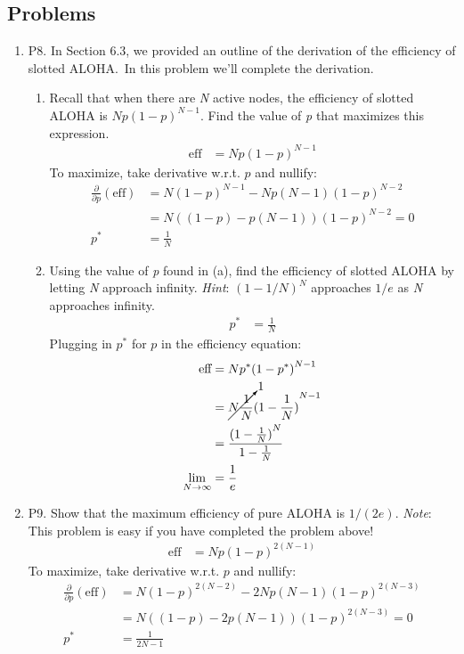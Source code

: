 \documentclass[12pt]{article}
\begin{document}
\subsection*{Problems}
\begin{enumerate}
    \item P8. In Section 6.3, we provided an outline of the derivation of the efficiency of slotted ALOHA.\ In this problem we’ll complete the derivation.
    \begin{enumerate}
        \item Recall that when there are \textit{N} active nodes, the efficiency of slotted ALOHA is \(Np{(1 - p)}^{N-1}\). Find the value of \textit{p} that maximizes this expression.
        \begin{align*}
            \text{eff}&=Np{(1 - p)}^{N-1}
        \end{align*}
        To maximize, take derivative w.r.t. \(p\) and nullify:
        \begin{align*}
            \frac{\partial}{\partial p}(\text{eff})&=N{(1-p)}^{N-1}-Np(N-1){(1-p)}^{N-2}\\
            &=N\left((1-p)-p(N-1)\right){(1-p)}^{N-2}=0\\
            p^*&=\frac{1}{N}
        \end{align*}
        \item Using the value of \textit{p} found in (a), find the efficiency of slotted ALOHA by letting \textit{N} approach infinity. \textit{Hint}: \({(1 - 1/N)}^N\) approaches \(1/e\) as \textit{N} approaches infinity.
        \begin{align*}
            p^*&=\frac{1}{N}
        \end{align*}
        Plugging in \(p^*\) for \(p\) in the efficiency equation:
        \begin{align*}
            \text{eff}&=Np^*{(1 - p^*)}^{N-1}\\
            &=\cancelto{1}{N\frac{1}{N}}{(1-\frac{1}{N})}^{N-1}\\
            &=\frac{{(1-\frac{1}{N})}^{N}}{1-\frac{1}{N}}\\
            \lim_{N \to \infty}&=\frac{1}{e}
        \end{align*}
    \end{enumerate}
    \item P9. Show that the maximum efficiency of pure ALOHA is \(1/(2e)\). \textit{Note}: This problem is easy if you have completed the problem above!
    \begin{align*}
        \text{eff}&=Np{(1 - p)}^{2(N-1)}
    \end{align*}
    To maximize, take derivative w.r.t. \(p\) and nullify:
    \begin{align*}
        \frac{\partial}{\partial p}(\text{eff})&=N{(1-p)}^{2(N-2)}-2Np(N-1){(1-p)}^{2(N-3)}\\
        &=N\left((1-p)-2p(N-1)\right){(1-p)}^{2(N-3)}=0\\
        p^*&=\frac{1}{2N-1}
    \end{align*}


\end{enumerate}
\end{document}
